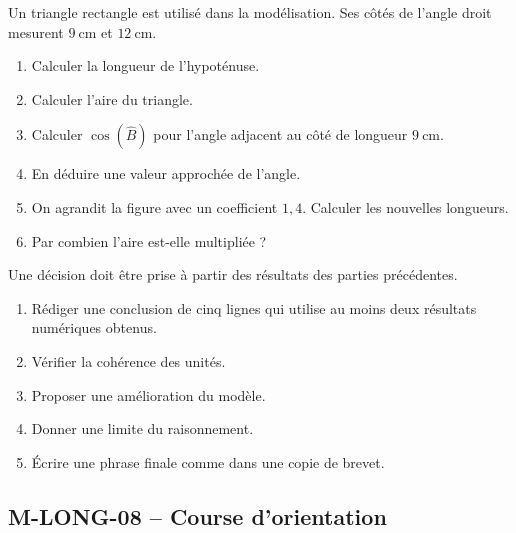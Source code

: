 \documentclass[11pt,a4paper]{article}
\newcounter{exercice}
\begin{document}
\begin{exercice}
Un triangle rectangle est utilisé dans la modélisation. Ses côtés de l'angle droit mesurent $9\ \mathrm{cm}$ et $12\ \mathrm{cm}$.
\begin{enumerate}
  \item Calculer la longueur de l'hypoténuse.
  \item Calculer l'aire du triangle.
  \item Calculer $\cos(\widehat{B})$ pour l'angle adjacent au côté de longueur $9\ \mathrm{cm}$.
  \item En déduire une valeur approchée de l'angle.
  \item On agrandit la figure avec un coefficient $1{,}4$. Calculer les nouvelles longueurs.
  \item Par combien l'aire est-elle multipliée ?
\end{enumerate}
\end{exercice}

\begin{exercice}
Une décision doit être prise à partir des résultats des parties précédentes.
\begin{enumerate}
  \item Rédiger une conclusion de cinq lignes qui utilise au moins deux résultats numériques obtenus.
  \item Vérifier la cohérence des unités.
  \item Proposer une amélioration du modèle.
  \item Donner une limite du raisonnement.
  \item Écrire une phrase finale comme dans une copie de brevet.
\end{enumerate}
\end{exercice}
\newpage
\subsection{M-LONG-08 -- Course d'orientation}
\end{document}
